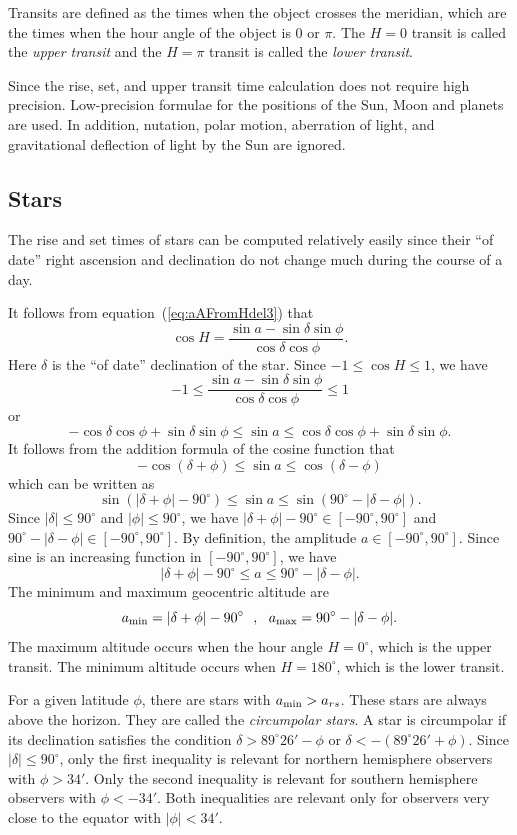 \documentclass[12pt]{article}
\newcommand \beq {\begin{equation}}
\newcommand \eeq {\end{equation}}
\begin{document}
Transits are defined as the times when the object crosses the meridian, which are 
the times when the hour angle of the object is 0 or $\pi$. The $H=0$ transit 
is called the {\em upper transit} and the $H=\pi$ transit is called the 
{\em lower transit}. 

Since the rise, set, and upper transit time calculation does not require high 
precision. Low-precision formulae for the positions of the Sun, Moon and planets 
are used. In addition, nutation, polar motion, aberration of light, and gravitational 
deflection of light by the Sun are ignored.

\subsection{Stars}

The rise and set times of stars can be computed relatively easily since their 
``of date'' right ascension and declination do not change much during the 
course of a day.

It follows from equation~(\ref{eq:aAFromHdel3}) that 
\beq
  \cos H = \frac{\sin a - \sin \delta \sin \phi}{\cos \delta \cos \phi} .
\label{eq:cosH}
\eeq
Here $\delta$ is the ``of date'' declination of the star. 
Since $-1 \leq \cos H \leq 1$, we have 
\beq
  -1 \leq \frac{\sin a - \sin \delta \sin \phi}{\cos \delta \cos \phi} \leq 1
\eeq
or 
\beq
  -\cos \delta \cos \phi + \sin \delta \sin \phi \leq \sin a \leq 
  \cos \delta \cos \phi + \sin \delta \sin \phi .
\eeq
It follows from the addition formula of the cosine function that 
\beq
  -\cos (\delta + \phi)  \leq \sin a \leq \cos (\delta - \phi) 
\eeq
which can be written as 
\beq
  \sin (|\delta + \phi| - 90^\circ) \leq \sin a \leq \sin (90^\circ - |\delta -\phi|) .
\eeq
Since $|\delta|\leq 90^\circ$ and $|\phi| \leq 90^\circ$, we have 
$|\delta + \phi| - 90^\circ \in [-90^\circ, 90^\circ]$ and 
$90^\circ - |\delta -\phi| \in [-90^\circ, 90^\circ]$. By definition, the 
amplitude $a \in [-90^\circ, 90^\circ]$. Since sine is an increasing function 
in $[-90^\circ, 90^\circ]$, we have 
\beq
  |\delta + \phi| - 90^\circ \leq a \leq 90^\circ - |\delta -\phi| .
\eeq
The minimum and maximum geocentric altitude are 
\beq
  a_{\rm min} = |\delta + \phi| - 90^\circ \ \ , \ \ 
  a_{\rm max} = 90^\circ - |\delta -\phi| .
\eeq
The maximum altitude occurs when the hour angle $H=0^\circ$, which is the upper transit.
The minimum altitude occurs when $H=180^\circ$, which is the lower transit.

For a given latitude $\phi$, there are stars with $a_{\rm min} > a_{rs}$. 
These stars are always above the horizon. They are called the {\em circumpolar stars}. 
A star is circumpolar if its declination satisfies the condition 
$\delta > 89^\circ 26' - \phi$ or $\delta < -(89^\circ 26' + \phi)$. 
Since $|\delta|\leq 90^\circ$, only the first inequality is relevant for 
northern hemisphere observers with $\phi > 34'$. Only the second inequality 
is relevant for southern hemisphere observers with $\phi < -34'$. Both inequalities 
are relevant only for observers very close to the equator with $|\phi|<34'$.
\end{document}
